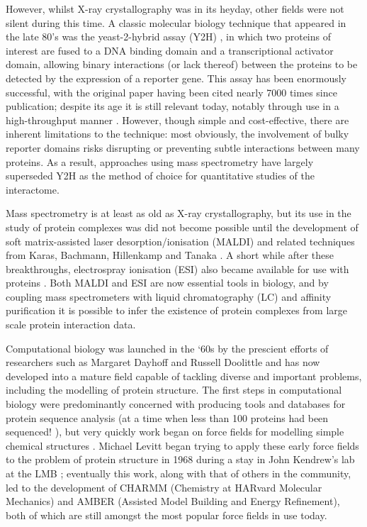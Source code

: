 \documentclass[a4paper,11pt,twoside,openright]{scrbook}
\begin{document}
However, whilst X-ray crystallography was in its heyday, other fields were not silent during this time. A classic molecular biology technique that appeared in the late 80's was the yeast-2-hybrid assay (Y2H) \cite{Fields1989}, in which two proteins of interest are fused to a DNA binding domain and a transcriptional activator domain, allowing binary interactions (or lack thereof) between the proteins to be detected by the expression of a reporter gene. This assay has been enormously successful, with the original paper having been cited nearly 7000 times since publication; despite its age it is still relevant today, notably through use in a high-throughput manner \cite{Rajagopala2014}. However, though simple and cost-effective, there are inherent limitations to the technique: most obviously, the involvement of bulky reporter domains risks disrupting or preventing subtle interactions between many proteins. As a result, approaches using mass spectrometry have largely superseded Y2H as the method of choice for quantitative studies of the interactome.

Mass spectrometry is at least as old as X-ray crystallography, but its use in the study of protein complexes was did not become possible until the development of soft matrix-assisted laser desorption/ionisation (MALDI) and related techniques from Karas, Bachmann, Hillenkamp and Tanaka \cite{Karas1985,Tanaka1988}. A short while after these breakthroughs, electrospray ionisation (ESI) also became available for use with proteins \cite{Fenn1989}. Both MALDI and ESI are now essential tools in biology, and by coupling mass spectrometers with liquid chromatography (LC) and affinity purification it is possible to infer the existence of protein complexes from large scale protein interaction data.

Computational biology was launched in the `60s by the prescient efforts of researchers such as Margaret Dayhoff and Russell Doolittle and has now developed into a mature field capable of tackling diverse and important problems, including the modelling of protein structure. The first steps in computational biology were predominantly concerned with producing tools and databases for protein sequence analysis (at a time when less than 100 proteins had been sequenced! \cite{Dayhoff1965}), but very quickly work began on force fields for modelling simple chemical structures \cite{Bixon1967}. Michael Levitt began trying to apply these early force fields to the problem of protein structure in 1968 during a stay in John Kendrew's lab at the LMB \cite{Levitt2001}; eventually this work, along with that of others in the community, led to the development of CHARMM \cite{Brooks2009} (Chemistry at HARvard Molecular Mechanics) and AMBER \cite{Salomon-Ferrer2013,Amber2017} (Assisted Model Building and Energy Refinement), both of which are still amongst the most popular force fields in use today.
\end{document}

